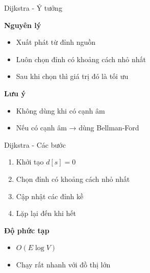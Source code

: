 \documentclass{beamer}
\begin{document}
\begin{frame}{Dijkstra - Ý tưởng}

\begin{tcolorbox}
\textbf{\faBolt Nguyên lý}
\begin{itemize}
\item Xuất phát từ đỉnh nguồn
\item Luôn chọn đỉnh có khoảng cách nhỏ nhất
\item Sau khi chọn thì giá trị đó là tối ưu
\end{itemize}
\end{tcolorbox}

\vspace{0.2cm}

\begin{tcolorbox}
\textbf{\faExclamationTriangle Lưu ý}
\begin{itemize}
\item Không dùng khi có cạnh âm
\item Nếu có cạnh âm → dùng Bellman-Ford
\end{itemize}
\end{tcolorbox}

\end{frame}

\begin{frame}{Dijkstra - Các bước}

\begin{tcolorbox}
\begin{enumerate}
\item Khởi tạo $d[s]=0$
\item Chọn đỉnh có khoảng cách nhỏ nhất
\item Cập nhật các đỉnh kề
\item Lặp lại đến khi hết
\end{enumerate}
\end{tcolorbox}

\vspace{0.2cm}

\begin{tcolorbox}
\textbf{\faClock Độ phức tạp}
\begin{itemize}
\item $O(E \log V)$
\item Chạy rất nhanh với đồ thị lớn
\end{itemize}
\end{tcolorbox}

\end{frame}
\end{document}

